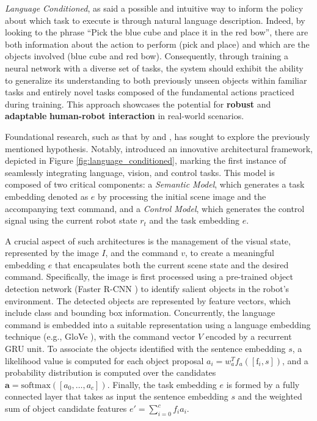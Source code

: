 \textit{Language Conditioned}, as said a possible and intuitive way to inform the policy about which task to execute is through natural language description. Indeed, by looking to the phrase ``Pick the blue cube and place it in the red bow'', there are both information about the action to perform (pick and place) and which are the objects involved (blue cube and red bow). Consequently, through training a neural network with a diverse set of tasks, the system should exhibit the ability to generalize its understanding to both previously unseen objects within familiar tasks and entirely novel tasks composed of the fundamental actions practiced during training. This approach showcases the potential for \textbf{robust} and \textbf{adaptable} \textbf{human-robot interaction} in real-world scenarios.

Foundational research, such as that by \cite{stepputtis2020language} and \cite{jang2022bc_z}, has sought to explore the previously mentioned hypothesis. Notably, \cite{stepputtis2020language} introduced an innovative architectural framework, depicted in Figure \ref{fig:language_conditioned}, marking the first instance of seamlessly integrating language, vision, and control tasks. This model is composed of two critical components: a \textit{Semantic Model}, which generates a task embedding denoted as $e$ by processing the initial scene image and the accompanying text command, and a \textit{Control Model}, which generates the control signal using the current robot state $r_{t}$ and the task embedding $e$.

A crucial aspect of such architectures is the management of the visual state, represented by the image $I$, and the command $v$, to create a meaningful embedding $e$ that encapsulates both the current scene state and the desired command. Specifically, the image is first processed using a pre-trained object detection network (Faster R-CNN \cite{fastrcnn}) to identify salient objects in the robot's environment. The detected objects are represented by feature vectors, which include class and bounding box information. Concurrently, the language command is embedded into a suitable representation using a language embedding technique (e.g., GloVe \cite{pennington2014glove}), with the command vector $V$ encoded by a recurrent GRU unit. To associate the objects identified with the sentence embedding $s$, a likelihood value is computed for each object proposal $a_{i} = w_{a}^{T} f_{a}([\text{f}_{i}, s])$, and a probability distribution is computed over the candidates $\mathbf{a} = \text{softmax}([a_0, \dots, a_c])$. Finally, the task embedding $e$ is formed by a fully connected layer that takes as input the sentence embedding $s$ and the weighted sum of object candidate features $e'= \sum_{i=0}^{c} f_{i}a_{i}$.

